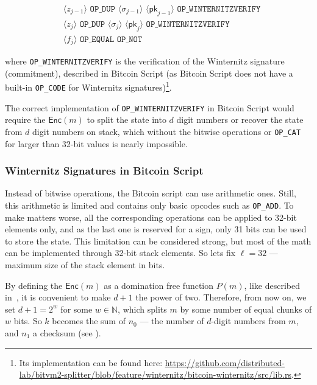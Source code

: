 \documentclass{iacrtrans}
\newcommand{\elem}[1]{\, \langle #1 \rangle \,}
\newcommand{\opcode}[1]{\, \texttt{#1} \,}
\begin{document}
\begin{empheqboxed}
  \begin{align*}
    &\elem{z_{j-1}} \opcode{OP\_DUP} \elem{\sigma_{j-1}}
    \elem{\mathsf{pk}_{j-1}} \opcode{OP\_WINTERNITZVERIFY} \\
    &\elem{z_{j}} \opcode{OP\_DUP} \elem{\sigma_{j}}
    \elem{\mathsf{pk}_{j}} \opcode{OP\_WINTERNITZVERIFY} \\
    &\elem{f_j} \opcode{OP\_EQUAL} \opcode{OP\_NOT}
  \end{align*}
\end{empheqboxed}

where \texttt{OP\_WINTERNITZVERIFY} is the verification of the
Winternitz signature (commitment), described in Bitcoin Script (as
  Bitcoin Script does not have a built-in \texttt{OP\_CODE} for
Winternitz signatures)\footnote{Its implementation can be found here:
\url{https://github.com/distributed-lab/bitvm2-splitter/blob/feature/winternitz/bitcoin-winternitz/src/lib.rs}.}.

The correct implementation of \texttt{OP\_WINTERNITZVERIFY} in Bitcoin
Script would require the $\mathsf{Enc}(m)$ to split the state into $d$
digit numbers or recover the state from $d$ digit numbers on stack,
which without the bitwise operations or \texttt{OP\_CAT} for larger
than 32-bit values is nearly impossible.

\subsubsection{Winternitz Signatures in Bitcoin
  Script}\label{sec:winternitz-in-bitcoin-script}

Instead of bitwise operations, the Bitcoin script can use arithmetic
ones. Still, this arithmetic is limited and contains only basic
opcodes such as \texttt{OP\_ADD}. To make matters worse, all the
corresponding operations can be applied to 32-bit elements only, and
as the last one is reserved for a sign, only 31 bits can be used to
store the state. This limitation can be considered strong, but most of
the math can be implemented through 32-bit stack elements. So lets fix
$\ell = 32$ --- maximum size of the stack element in bits.

By defining the $\mathsf{Enc}(m)$ as a domination free function
$P(m)$, like described in~\cite{applied-crypto}, it is convenient to
make $d+1$ the power of two. Therefore, from now on, we set
$d+1 = 2^w$ for some $w \in \mathbb{N}$, which splits $m$ by some number of equal
chunks of $w$ bits. So $k$ becomes the sum of $n_0$ --- the number of
$d$-digit numbers from $m$, and $n_1$ a checksum (see
).
\end{document}
